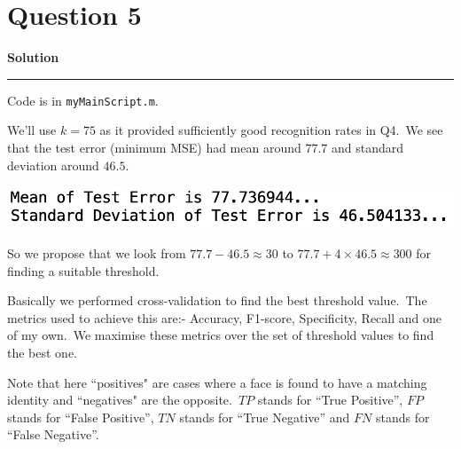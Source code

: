 \documentclass[a4paper,12pt]{article}
\title{\cooltitle{CS663 Assignment-4}}
\author{{\bf Saksham Rathi, Kavya Gupta, Shravan Srinivasa Raghavan} \\
\small Department of Computer Science, \\
Indian Institute of Technology Bombay \\}
\date{}
\newenvironment{solution}[2][]{%
    \begin{mdframed}[linecolor=blue!70!black, linewidth=2pt, roundcorner=10pt, backgroundcolor=yellow!10!white, skipabove=12pt, skipbelow=12pt]%
        \textbf{\large #2}
        \par\noindent\rule{\textwidth}{0.4pt}
}{
    \end{mdframed}
}
\begin{document}
\maketitle

\section*{Question 5}

\begin{solution}{Solution}
	Code is in \texttt{myMainScript.m}.

	We'll use $k = 75$ as it provided sufficiently good recognition rates in Q4.\ We see that the test error (minimum MSE) had mean around $77.7$ and standard deviation around $46.5$.

	\begin{center}
		\includegraphics[scale=0.5]{../images/mean_std-dev.png}
	\end{center}

	So we propose that we look from $77.7 - 46.5 \approx 30$ to $77.7 + 4 \times 46.5 \approx 300$ for finding a suitable threshold.

	Basically we performed cross-validation to find the best threshold value.\ The metrics used to achieve this are:- Accuracy, F1-score, Specificity, Recall and one of my own.\ We maximise these metrics over the set of threshold values to find the best one.

	Note that here ``positives" are cases where a face is found to have a matching identity and ``negatives" are the opposite.\ $TP$ stands for ``True Positive'', $FP$ stands for ``False Positive'', $TN$ stands for ``True Negative'' and $FN$ stands for ``False Negative''.


\end{solution}
\end{document}
